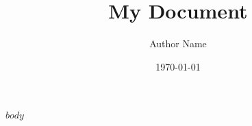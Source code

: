 \documentclass{article}
\title{My Document}
\author{Author Name}
\date{\today}
\begin{document}
\maketitle

$body$
\end{document}
